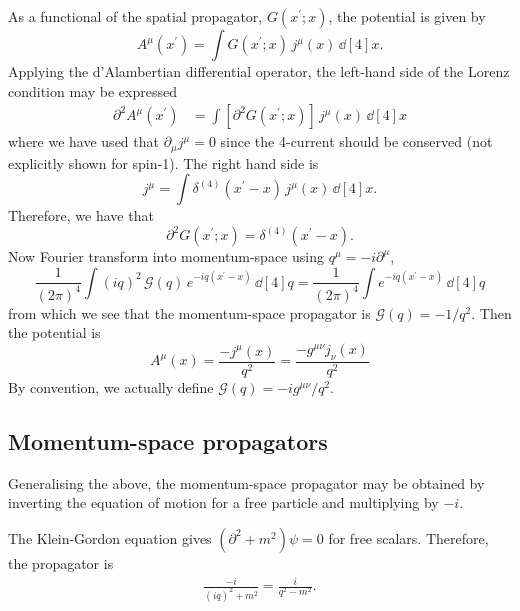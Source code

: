 As a functional of the spatial propagator, $G(x^\prime; x)$, the potential is given by
\begin{equation}
A^\mu(x^\prime) = \int G(x^\prime; x) \, j^\mu(x) \, \dd[4]{x}.
\end{equation}
Applying the d'Alambertian differential operator, the left-hand side of the Lorenz condition may be expressed
\begin{align}
\partial^2 A^\mu(x^\prime) &= \int  \left[ \partial^2 G(x^\prime; x) \right] \, j^\mu(x) \, \dd[4]{x}
\end{align}
where we have used that $\partial_\mu j^\mu = 0$ since the 4-current should be conserved (not explicitly shown for spin-1). The right hand side is
\begin{equation}
j^\mu = \int \delta^{(4)}(x^\prime - x) \, j^\mu(x) \, \dd[4]{x}.
\end{equation}
Therefore, we have that
\begin{equation}
\partial^2 G(x^\prime; x) = \delta^{(4)}(x^\prime - x).
\end{equation}
Now Fourier transform into momentum-space using $q^\mu = -i\partial^\mu$,
\begin{equation}
\frac{1}{(2\pi)^4} \int (iq)^2 \, \mathcal{G}(q) \, e^{-iq(x^\prime - x)} \, \dd[4]{q}  = \frac{1}{(2\pi)^4} \int e^{-iq(x^\prime - x)} \, \dd[4]{q}
\end{equation}
from which we see that the momentum-space propagator is $\mathcal{G}(q) = -1/q^2$. Then the potential is
\begin{equation}
A^\mu(x) = \frac{-j^\mu(x)}{q^2} = \frac{-g^{\mu\nu} j_\nu(x)}{q^2}
\end{equation}
By convention, we actually define $\boxed{\mathcal{G}(q) = -i g^{\mu\nu}/q^2}$.

\subsection{Momentum-space propagators}
Generalising the above, the momentum-space propagator may be obtained by inverting the equation of motion for a free particle and multiplying by $-i$.

The Klein-Gordon equation gives $(\partial^2 + m^2)\psi = 0$ for free scalars. Therefore, the propagator is
\begin{align}
\frac{-i}{(iq)^2 + m^2} = \frac{i}{q^2-m^2}.
\end{align}

